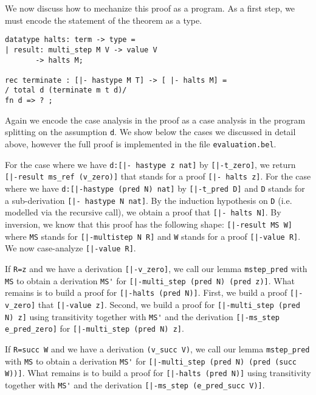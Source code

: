 We now discuss how to mechanize this proof as a program. As a first step, we
must encode the statement of the theorem as a type.

\begin{lstlisting}
datatype halts: term -> type =
| result: multi_step M V -> value V
       -> halts M;

rec terminate : [|- hastype M T] -> [ |- halts M] =
/ total d (terminate m t d)/
fn d => ? ;
\end{lstlisting}

Again we encode the case analysis in the proof as a case analysis in the program
splitting on the assumption \lstinline!d!. We show below the cases we discussed
in detail above, however the full proof is implemented in the file
\lstinline!evaluation.bel!.

For the case where we have \lstinline!d:[|- hastype z nat]! by
\lstinline![|-t_zero]!, we return \lstinline![|-result ms_ref (v_zero)]! that
stands for a proof \lstinline![|- halts z]!. For the case where we have
\lstinline!d:[|-hastype (pred N) nat]! by \lstinline![|-t_pred D]! and
\lstinline!D! stands for a sub-derivation \lstinline![|- hastype N nat]!. By the
induction hypothesis on \lstinline!D! (i.e. modelled via the recursive call), we
obtain a proof that \lstinline![|- halts N]!.  By inversion, we know that this
proof has the following shape: \lstinline![|-result MS W]! where \lstinline!MS!
stands for \lstinline![|-multistep N R]! and \lstinline!W!
stands for a proof \lstinline![|-value R]!. We now case-analyze
\mbox{\lstinline![|-value R]!}.

If \lstinline!R=z! and we have a derivation
\lstinline![|-v_zero]!, we call our lemma \lstinline!mstep_pred! with
\lstinline!MS! to obtain a derivation \lstinline!MS'! for
\lstinline![|-multi_step (pred N) (pred z)]!. What remains is to build a proof
for \lstinline![|-halts (pred N)]!. First, we build a proof \lstinline![|-v_zero]!
that \lstinline![|-value z]!. Second, we build a proof for
\lstinline![|-multi_step (pred N) z]! using transitivity together with
\lstinline!MS'! and the derivation \lstinline![|-ms_step e_pred_zero]! for
\mbox{\lstinline![|-multi_step (pred N) z]!}.

If \lstinline!R=succ W! and we have a derivation
\lstinline!(v_succ V)!, we call our lemma \lstinline!mstep_pred! with
\lstinline!MS! to obtain a derivation \lstinline!MS'! for
\lstinline![|-multi_step (pred N) (pred (succ W))]!. What remains is to build a proof
for \lstinline![|-halts (pred N)]! using transitivity together with
\lstinline!MS'! and the derivation
\lstinline![|-ms_step (e_pred_succ V)]!.

